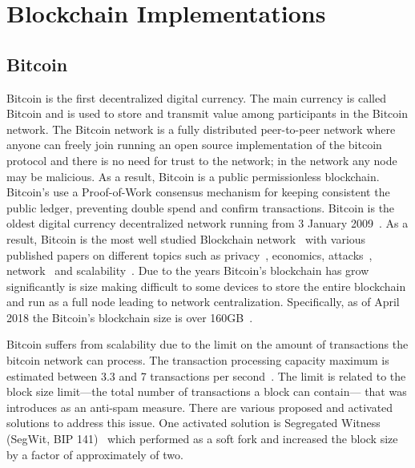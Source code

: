 \section{Blockchain Implementations}\label{blockchain_implementations}

\subsection{Bitcoin}\label{blockchain:impl:bitcoin}

Bitcoin is the first decentralized digital currency. The main currency is called Bitcoin and is used to store and transmit value among participants in the Bitcoin network. The Bitcoin network is a fully distributed peer-to-peer network where anyone can freely join running an open source implementation of the bitcoin protocol and there is no need for trust to the network; in the network any node may be malicious. As a result, Bitcoin is a public permissionless blockchain. Bitcoin's use a Proof-of-Work consensus mechanism for keeping consistent the public ledger, preventing double spend and confirm transactions. Bitcoin is the oldest digital currency decentralized network running from 3 January 2009~\cite{btc_first_block}. As a result, Bitcoin is the most well studied Blockchain network~\cite{10.1007/978-3-662-46803-6_10} with various published papers on different topics such as privacy~\cite{10.1007/978-3-319-70278-0_8, 10.1007/978-3-642-39884-1_2, Bonneau14e.w.:mixcoin, 10.1007/978-3-662-44774-1_9}, economics\cite{Babaioff:2012:BRB:2229012.2229022, 10.1007/978-3-319-70278-0_17, Bentov2017DecentralizedPM, Carlsten:2016:IBW:2976749.2978408}, attacks~\cite{DBLP:journals_corr_Bahack13, DBLP:journals_corr_EyalS13}, network~\cite{10.1007/978-3-662-44774-1_7, 190890} and scalability~\cite{kiayias2017non, 10.1007/978-3-662-53357-4_5, 10.1007/978-3-662-53357-4_8}. Due to the years Bitcoin's blockchain has grow significantly is size making difficult to some devices to store the entire blockchain and run as a full node leading to network centralization. Specifically, as of April 2018 the Bitcoin's blockchain size is over 160GB~\cite{btc_bl_size}.

Bitcoin suffers from scalability due to the limit on the amount of transactions the bitcoin network can process. The transaction processing capacity maximum is estimated between 3.3 and 7 transactions per second~\cite{10.1007/978-3-662-53357-4_8}. The limit is related to the block size limit---the total number of transactions a block can contain--- that was introduces as an anti-spam measure. There are various proposed and activated solutions to address this issue. One activated solution is Segregated Witness (SegWit, BIP 141)~\cite{segwit} which performed as a soft fork and increased the block size by a factor of approximately of two.

